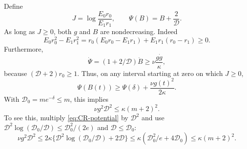 Define
\[
 J=\log\frac{E_0r_0}{E_1r_1},\qquad
 \Psi(B)=B+\frac{2}{\mathcal D}.
\]
As long as $J\ge0$, both $g$ and $B$ are nondecreasing. Indeed
\[
 E_0r_0^2-E_1r_1^2
 =r_0(E_0r_0-E_1r_1)+E_1r_1(r_0-r_1)\ge0.
\]
Furthermore,
\[
 \dot \Psi=(1+2/\mathcal D)\dot B\ge\nu\frac{g\dot g}{\kappa},
\]
because $(\mathcal D+2)r_0\ge1$. Thus, on any interval starting at zero on which $J\ge0$,
\begin{equation}
 \Psi(B(t))\ge \Psi(\delta)+\frac{\nu g(t)^2}{2\kappa}.
 \label{eq:CR-potential}
\end{equation}
With $\mathcal D_0=me^{-\delta}\le m$, this implies
\begin{equation}
 \nu g^2\mathcal D^2\le\kappa(m+2)^2.
 \label{eq:CR-budget}
\end{equation}
To see this, multiply \eqref{eq:CR-potential} by $\mathcal D^2$ and use
$\mathcal D^2\log(\mathcal D_0/\mathcal D)\le \mathcal D_0^2/(2e)$ and $\mathcal D\le \mathcal D_0$:
\[
 \nu g^2\mathcal D^2\le2\kappa\{\mathcal D^2\log(\mathcal D_0/\mathcal D)+2\mathcal D\}
 \le\kappa(\mathcal D_0^2/e+4\mathcal D_0)\le\kappa(m+2)^2.
\]

